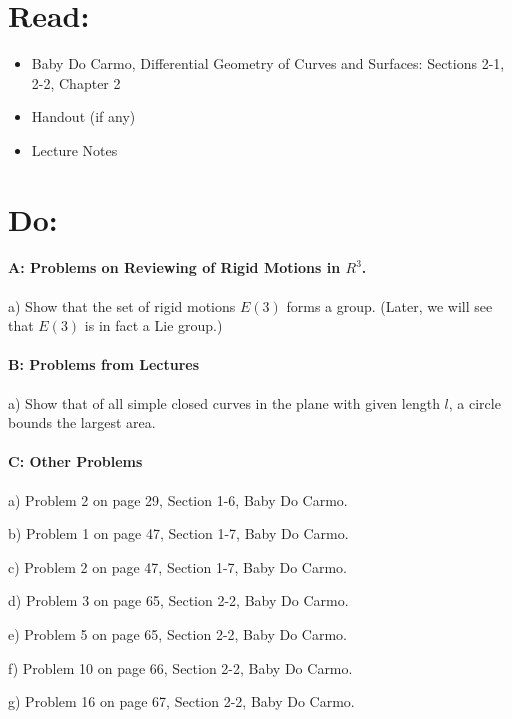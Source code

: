 \documentclass[12pt]{article}
\title{\rightline {\Huge {}}}
\author{\LARGE {HMC\quad Math 142 \quad Fall 2026} 
\\ {Prof. Gu}  
\\ {\LARGE Problem Set 4}}
\date{Start this assignment before Sunday night!}
\begin{document}
\maketitle

\section*{ Read: }

\begin{itemize}
	\item{Baby Do Carmo, Differential Geometry
		      of Curves and Surfaces:
		      Sections 2-1, 2-2, Chapter 2}
	\item{Handout (if any)}
	\item{Lecture Notes}
\end{itemize}

\section*{ Do: }
\paragraph{A: Problems on Reviewing of Rigid Motions in $R^3$.}
\begin{itemize}

	{\item a) Show that the set of rigid motions $E(3)$ forms a group.
		(Later, we will see that  $E(3)$ is in fact a Lie group.)}

\end{itemize}

\medskip
\paragraph{B: Problems from Lectures}

\begin{itemize}
	{\item a) Show that of all simple closed curves in the plane with
		given length $l$, a circle bounds the largest area.}

\end{itemize}

\paragraph{C: Other Problems}
\begin{itemize}
	{\item a) Problem 2 on page 29, Section 1-6, Baby Do Carmo.}
	{\item b) Problem 1 on page 47, Section 1-7, Baby Do Carmo.}
	{\item c) Problem 2 on page 47, Section 1-7, Baby Do Carmo.}
	{\item d) Problem 3 on page 65, Section 2-2, Baby Do Carmo.}
	{\item e) Problem 5 on page 65, Section 2-2, Baby Do Carmo.}
	{\item f) Problem 10 on page 66, Section 2-2, Baby Do Carmo.}
	{\item g) Problem 16 on page 67, Section 2-2, Baby Do Carmo.}

\end{itemize}
\end{document}
